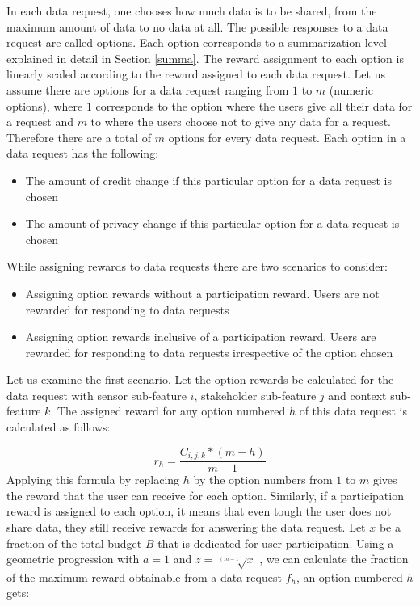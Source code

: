 In each data request, one chooses how much data is to be shared, from the maximum amount of data to no data at all. The possible responses to a data request are called options. Each option corresponds to a summarization level explained in detail in Section \ref{summa}. The reward assignment to each option is linearly scaled according
to the reward assigned to each data request. Let us assume there are options for a data request ranging from $1$ to $m$ (numeric options), where $1$ corresponds to the option where the users give all their data for a request and $m$ to where the users choose not to give any data for a request. Therefore there are a total of $m$ options for every data request. Each option in a data request has the following:

\begin{itemize}
\item The amount of credit change if this particular option for a data request is chosen
\item The amount of privacy change if this particular option for a data request is chosen
\end{itemize}

While assigning rewards to data requests there are two scenarios to consider:

\begin{itemize}
\item Assigning option rewards without a participation reward. Users are not rewarded for responding to data requests
\item Assigning option rewards inclusive of a participation reward. Users are rewarded for responding to data requests irrespective of the option chosen
\end{itemize}

Let us examine the first scenario. Let the option rewards be calculated for the data request with sensor sub-feature $i$, stakeholder sub-feature $j$ and
context sub-feature $k$. The assigned reward for any option numbered $h$ of this data request is calculated as follows:

\begin{equation}
r_{h} =  \frac{C_{i,j,k}*(m-h)}{m-1}
\end{equation}
Applying this formula by replacing $h$ by the option numbers from $1$ to $m$ gives the reward that the user can receive for each option.
Similarly, if a participation reward is assigned to each option, it means that even tough the user does not share data, they still
receive rewards for answering the data request. Let $x$ be a fraction of the total budget $B$ that is dedicated for user participation. Using a geometric progression with $a=1$ and $z=\sqrt[(m-1)]{x}$ , we can calculate the fraction of the maximum reward obtainable from a data request $f_{h}$, an option numbered $h$ gets:

